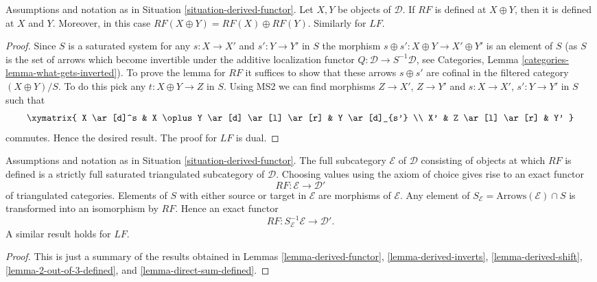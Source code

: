 \begin{lemma}
\label{lemma-direct-sum-defined}
Assumptions and notation as in
Situation \ref{situation-derived-functor}.
Let $X, Y$ be objects of $\mathcal{D}$.
If $RF$ is defined at $X \oplus Y$, then it is defined
at $X$ and $Y$. Moreover, in this case
$RF(X \oplus Y) = RF(X) \oplus RF(Y)$. Similarly for $LF$.
\end{lemma}

\begin{proof}
Since $S$ is a saturated system for any $s : X \to X'$ and $s' : Y \to Y'$
in $S$ the morphism $s \oplus s' : X \oplus Y \to X' \oplus Y'$ is an
element of $S$ (as $S$ is the set of arrows which become invertible
under the additive localization functor
$Q : \mathcal{D} \to S^{-1}\mathcal{D}$, see
Categories, Lemma \ref{categories-lemma-what-gets-inverted}).
To prove the lemma for $RF$ it suffices to show that these arrows
$s \oplus s'$ are cofinal in the filtered category $(X \oplus Y)/S$.
To do this pick any $t : X \oplus Y \to Z$ in $S$.
Using MS2 we can find morphisms $Z \to X'$, $Z \to Y'$
and $s : X \to X'$, $s' : Y \to Y'$ in $S$ such that
$$
\xymatrix{
X \ar[d]^s & X \oplus Y \ar[d] \ar[l] \ar[r] & Y \ar[d]_{s'} \\
X' & Z \ar[l] \ar[r] & Y'
}
$$
commutes. Hence the desired result. The proof for $LF$ is dual.
\end{proof}

\begin{proposition}
\label{proposition-derived-functor}
Assumptions and notation as in
Situation \ref{situation-derived-functor}.
The full subcategory $\mathcal{E}$ of $\mathcal{D}$ consisting of
objects at which $RF$ is defined is a strictly full saturated triangulated
subcategory of $\mathcal{D}$. Choosing values using the axiom of choice
gives rise to an exact functor
$$
RF : \mathcal{E} \longrightarrow \mathcal{D}'
$$
of triangulated categories. Elements of $S$ with either source or target
in $\mathcal{E}$ are morphisms of $\mathcal{E}$. Any element of
$S_\mathcal{E} = \text{Arrows}(\mathcal{E}) \cap S$
is transformed into an isomorphism by $RF$. Hence an exact functor
$$
RF : S_\mathcal{E}^{-1}\mathcal{E} \longrightarrow \mathcal{D}'.
$$
A similar result holds for $LF$.
\end{proposition}

\begin{proof}
This is just a summary of the results obtained in
Lemmas \ref{lemma-derived-functor},
\ref{lemma-derived-inverts},
\ref{lemma-derived-shift},
\ref{lemma-2-out-of-3-defined}, and
\ref{lemma-direct-sum-defined}.
\end{proof}

